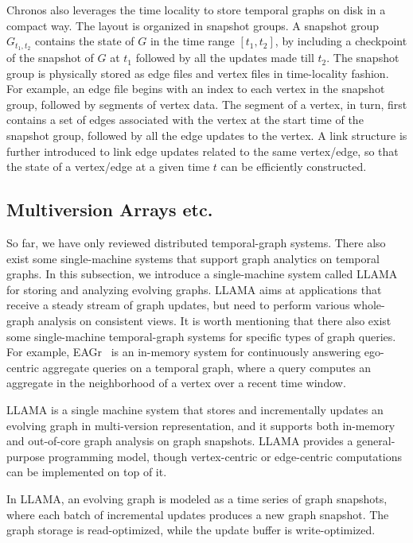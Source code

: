 \documentclass{svjour3}
\begin{document}
\vspace{2mm}


 Chronos also leverages the time locality to store temporal graphs on disk in a compact way. The layout is organized in snapshot groups. A snapshot group $G_{t_1,t_2}$ contains the state of $G$ in the time range $[t_1,t_2]$, by including a checkpoint of the snapshot of $G$ at $t_1$ followed by all the updates made till $t_2$. The snapshot group is physically stored as edge files and vertex files in time-locality fashion. For example, an edge file begins with an index to each vertex in the snapshot group, followed by segments of vertex data. The segment of a vertex, in turn, first contains a set of edges associated with the vertex at the start time of the snapshot group, followed by all the edge updates to the vertex. A link structure is further introduced to link edge updates related to the same vertex/edge, so that the state of a vertex/edge at a given time $t$ can be efficiently constructed.

\subsection{Multiversion Arrays etc.}
So far, we have only reviewed distributed temporal-graph systems. There also exist some single-machine systems that support graph analytics on temporal graphs. In this subsection, we introduce a single-machine system called LLAMA~\cite{macko2015llama} for storing and analyzing evolving graphs. LLAMA aims at applications that receive a steady stream of graph updates, but need to perform various whole-graph analysis on consistent views. It is worth mentioning that there also exist some single-machine temporal-graph systems for specific types of graph queries. For example, EAGr~\cite{eagr} is an in-memory system for continuously answering ego-centric aggregate queries on a temporal graph, where a query computes an aggregate in the neighborhood of a vertex over a recent time window.

LLAMA is a single machine system that stores and incrementally updates an evolving graph in multi-version representation, and it supports both in-memory and out-of-core graph analysis on graph snapshots. LLAMA provides a general-purpose programming model, though vertex-centric or edge-centric computations can be implemented on top of it.

In LLAMA, an evolving graph is modeled as a time series of graph snapshots, where each batch of incremental updates produces a new graph snapshot. The graph storage is read-optimized, while the update buffer is write-optimized.
\end{document}

